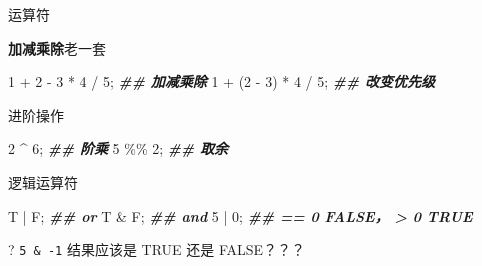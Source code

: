 \documentclass[ignorenonframetext,]{beamer}
\newenvironment{Shaded}{\begin{snugshade}}{\end{snugshade}}
\newcommand{\DecValTok}[1]{\textcolor[rgb]{0.00,0.00,0.81}{#1}}
\newcommand{\DocumentationTok}[1]{\textcolor[rgb]{0.56,0.35,0.01}{\textbf{\textit{#1}}}}
\newcommand{\NormalTok}[1]{#1}
\newcommand{\SpecialCharTok}[1]{\textcolor[rgb]{0.00,0.00,0.00}{#1}}
\newcommand\FontSmall{\fontsize{7}{8}\selectfont}
\newcommand\FontNormal{\fontsize{10}{10}\selectfont}
\begin{document}
\begin{frame}[fragile]{运算符}
\protect\hypertarget{ux8fd0ux7b97ux7b26}{}
\begin{block}{\textbf{加减乘除}老一套}
\protect\hypertarget{ux52a0ux51cfux4e58ux9664ux8001ux4e00ux5957}{}
\FontSmall

\begin{Shaded}
\begin{Highlighting}[]
\DecValTok{1} \SpecialCharTok{+} \DecValTok{2} \SpecialCharTok{{-}} \DecValTok{3} \SpecialCharTok{*} \DecValTok{4} \SpecialCharTok{/} \DecValTok{5}\NormalTok{; }\DocumentationTok{\#\# 加减乘除}
\DecValTok{1} \SpecialCharTok{+}\NormalTok{ (}\DecValTok{2} \SpecialCharTok{{-}} \DecValTok{3}\NormalTok{) }\SpecialCharTok{*} \DecValTok{4} \SpecialCharTok{/} \DecValTok{5}\NormalTok{;  }\DocumentationTok{\#\#  改变优先级}
\end{Highlighting}
\end{Shaded}

\FontNormal
\end{block}

\begin{block}{进阶操作}
\protect\hypertarget{ux8fdbux9636ux64cdux4f5c}{}
\FontSmall

\begin{Shaded}
\begin{Highlighting}[]
\DecValTok{2} \SpecialCharTok{\^{}} \DecValTok{6}\NormalTok{; }\DocumentationTok{\#\# 阶乘}
\DecValTok{5} \SpecialCharTok{\%\%} \DecValTok{2}\NormalTok{; }\DocumentationTok{\#\# 取余}
\end{Highlighting}
\end{Shaded}

\FontNormal
\end{block}

\begin{block}{逻辑运算符}
\protect\hypertarget{ux903bux8f91ux8fd0ux7b97ux7b26}{}
\FontSmall

\begin{Shaded}
\begin{Highlighting}[]
\NormalTok{T }\SpecialCharTok{|}\NormalTok{ F; }\DocumentationTok{\#\# or }
\NormalTok{T }\SpecialCharTok{\&}\NormalTok{ F; }\DocumentationTok{\#\# and}
\DecValTok{5} \SpecialCharTok{|} \DecValTok{0}\NormalTok{; }\DocumentationTok{\#\# == 0 FALSE， \textgreater{} 0 TRUE}
\end{Highlighting}
\end{Shaded}

\FontNormal

? \texttt{5\ \&\ -1} 结果应该是 TRUE 还是 FALSE？？？
\end{block}
\end{frame}
\end{document}
